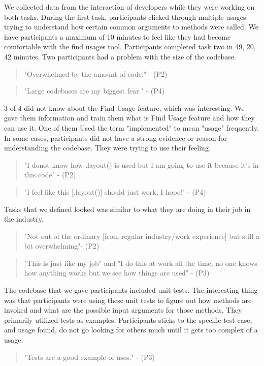 \documentclass[conference]{IEEEtran}
\begin{document}
We collected data from the interaction of developers while they were working on both tasks. During the first task, participants clicked through multiple usages trying to understand how certain common arguments to methods were called. We have participants a maximum of 10 minutes to feel like they had become comfortable with the find usages tool. Participants completed task two in 49, 20, 42 minutes. Two participants had a problem with the size of the codebase.
\begin{quote}"Overwhelmed by the amount of code." - (P2) \end{quote}
\begin{quote}"Large codebases are my biggest fear." - (P4) \end{quote}
3 of 4 did not know about the Find Usage feature, which was interesting. We gave them information and train them what is Find Usage feature and how they can use it. One of them Used the term "implemented" to mean "usage" frequently. In some cases, participants did not have a strong evidence or reason for understanding the codebase. They were trying to use their feeling. 
\begin{quote}"I donot know how .layout() is used but I am going to use it because it's in this code" - (P2) \end{quote}
\begin{quote}"I feel like this [.layout()] should just work, I hope!" - (P4) \end{quote}

Tasks that we defined looked was similar to what they are doing in their job in the industry. 
\begin{quote}
"Not out of the ordinary [from regular industry/work experience] but still a bit overwhelming"- (P2)
\end{quote}
\begin{quote} "This is just like my job" and "I do this at work all the time, no one knows how anything works but we see how things are used"
- (P3)
\end{quote}
The codebase that we gave participants included unit tests. The interesting thing was that participants were using these unit tests to figure out how methods are invoked and what are the possible input arguments for those methods. They primarily utilized tests as examples. Participants sticks to the specific test case, and usage found, do not go looking for others much until it gets too complex of a usage.

\begin{quote} "Tests are a good example of uses." - (P3)\end{quote}
\end{document}
